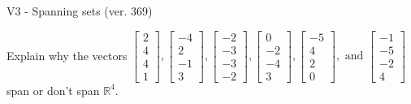\begin{exercise}
  \begin{exerciseTitle}V3 - Spanning sets (ver. 369)\end{exerciseTitle}
  \begin{exerciseStatement}
    Explain why the vectors \(\left[\begin{array}{r}
2 \\
4 \\
4 \\
1
\end{array}\right] , \left[\begin{array}{r}
-4 \\
2 \\
-1 \\
3
\end{array}\right] , \left[\begin{array}{r}
-2 \\
-3 \\
-3 \\
-2
\end{array}\right] , \left[\begin{array}{r}
0 \\
-2 \\
-4 \\
3
\end{array}\right] , \left[\begin{array}{r}
-5 \\
4 \\
2 \\
0
\end{array}\right] , \text{ and } \left[\begin{array}{r}
-1 \\
-5 \\
-2 \\
4
\end{array}\right]\) span or don't span \(\mathbb{R}^4\). 
	



\end{exerciseStatement}
\end{exercise}
